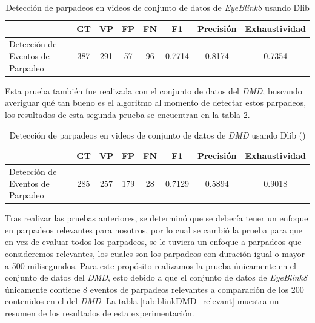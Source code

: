 \begin{table}[h!]
    \centering
    \footnotesize
    \renewcommand{\arraystretch}{1.8}
    \begin{tabularx}{\textwidth}{X c c c c c c c}
        \toprule
        & \textbf{GT} & \textbf{VP} & \textbf{FP} & \textbf{FN} & \textbf{F1} & \textbf{Precisión} & \textbf{Exhaustividad} \\
        \midrule
        Detección de Eventos de Parpadeo & 387 & 291 & 57 & 96 & 0.7714 & 0.8174 & 0.7354 \\
        \bottomrule
    \end{tabularx}
    \caption{Detección de parpadeos en videos de conjunto de datos de \textit{EyeBlink8} usando Dlib}
    \label{tab:blinkEB8}
\end{table}

Esta prueba también fue realizada con el conjunto de datos del \textit{DMD}, buscando averiguar qué tan bueno es el algoritmo al momento de detectar estos parpadeos, los resultados de esta segunda prueba se encuentran en la tabla \ref{tab:blinkDMD}.

\begin{table}[h!]
    \centering
    \footnotesize
    \renewcommand{\arraystretch}{1.8}
    \begin{tabularx}{\textwidth}{X c c c c c c c}
        \toprule
        & \textbf{GT} & \textbf{VP} & \textbf{FP} & \textbf{FN} & \textbf{F1} & \textbf{Precisión} & \textbf{Exhaustividad} \\
        \midrule
        Detección de Eventos de Parpadeo & 285 & 257 & 179 & 28 & 0.7129 & 0.5894 & 0.9018 \\
        \bottomrule
    \end{tabularx}
    \caption{Detección de parpadeos en videos de conjunto de datos de \textit{DMD} usando Dlib (\cite{DMD})}
    \label{tab:blinkDMD}
\end{table}


Tras realizar las pruebas anteriores, se determinó que se debería tener un enfoque en parpadeos relevantes para nosotros, por lo cual se cambió la prueba para que en vez de evaluar todos los parpadeos, se le tuviera un enfoque a parpadeos que consideremos relevantes, los cuales son los parpadeos con duración igual o mayor a 500 milisegundos. Para este propósito realizamos la prueba únicamente en el conjunto de datos del \textit{DMD}, esto debido a que el conjunto de datos de \textit{EyeBlink8} únicamente contiene 8 eventos de parpadeos relevantes a comparación de los 200 contenidos en el del \textit{DMD}. La tabla \ref{tab:blinkDMD_relevant} muestra un resumen de los resultados de esta experimentación.


